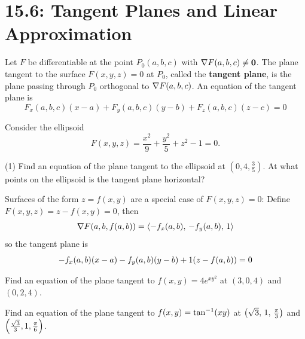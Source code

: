 \documentclass[mathNotesPreamble]{subfiles}
\begin{document}
\section{15.6: Tangent Planes and Linear Approximation}

  \begin{defn*}[Equation of the Tangent Plane for $F(x,y,z)=0$]
    Let $F$ be differentiable at the point $P_0(a,b,c)$ with $\nabla F(a,b,c)\neq \mathbf{0}$. The plane tangent to the surface $F(x,y,z)=0$ at $P_0$, called the \textbf{tangent plane}, is the plane passing through $P_0$ orthogonal to $\nabla F(a,b,c)$. An equation of the tangent plane is
      \[F_x(a,b,c)(x-a)+F_y(a,b,c)(y-b)+F_z(a,b,c)(z-c)=0\]
  \end{defn*}

  \begin{ex*}
    Consider the ellipsoid 
      \[F(x,y,z)= \frac{x^2}{9}+\frac{y^2}{5}+z^2-1=0.\]
    \begin{tasks}[after-item-skip=\stretch{1}](1)
      \task Find an equation of the plane tangent to the ellipsoid at $(0,4, \frac{3}{5})$.
      \task At what points on the ellipsoid is the tangent plane horizontal?
    \end{tasks}
  \end{ex*}
  \pagebreak

  Surfaces of the form $z=f(x,y)$ are a special case of $F(x,y,z)=0$: Define $F(x,y,z)=z-f(x,y)=0$, then
    \[\nabla F{\left(a,b,f(a,b)\right)}={\left\langle -f_x(a,b),\,-f_y(a,b),\,1 \right\rangle}\]
  so the tangent plane is
    \[-f_x(a,b)(x-a)-f_y(a,b)(y-b)+1{\left(z-f(a,b)\right)}=0\]
  \noindent

  \begin{ex*}
    Find an equation of the plane tangent to $f(x,y)=4e^{xy^2}$ at $(3,0,4)$ and $(0,2,4)$.
  \end{ex*}
  \pagebreak

  \begin{ex*}
    Find an equation of the plane tangent to $f(x,y)=\tan^{-1}(xy)$ at ${\left(\sqrt{3},\,1,\,\frac{\pi}{3}\right)}$ and ${\left(\frac{\sqrt{3}}{3},1,\frac{\pi}{6}\right)}$.
  \end{ex*}
\end{document}
